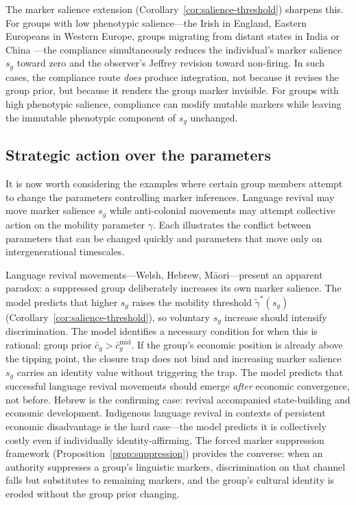 \documentclass[12pt,a4paper]{article}
\theoremstyle{definition}
\numberwithin{proposition}{subsection}
\begin{document}
The marker salience extension
(Corollary~\ref{cor:salience-threshold}) sharpens this. For groups
with low phenotypic salience---the Irish in England, Eastern
Europeans in Western Europe, groups migrating from distant states in India or China ---the compliance simultaneously reduces the
individual's marker salience $s_g$ toward zero and the observer's Jeffrey revision
toward non-firing. In such cases, the compliance route \emph{does}
produce integration, not because it revises the group prior, but
because it renders the group marker invisible. For groups with high
phenotypic salience, compliance
can modify mutable markers while leaving the immutable phenotypic
component of $s_g$ unchanged. 

\subsection{Strategic action over the parameters}
\label{subsec:cluster-parameters}

It is now worth considering the examples where certain group members attempt to change the parameters controlling marker inferences. Language revival may move marker salience $s_g$ while anti-colonial movements may attempt
collective action on the mobility parameter $\gamma$. Each illustrates the conflict between
parameters that can be changed quickly and parameters that move only
on intergenerational timescales.

Language revival movements---Welsh, Hebrew, M\={a}ori---present an
apparent paradox: a suppressed group deliberately increases its own
marker salience. The model predicts that higher $s_g$ raises the
mobility threshold $\tilde{\gamma}^*(s_g)$
(Corollary~\ref{cor:salience-threshold}), so voluntary $s_g$ increase
should intensify discrimination. The model
identifies a necessary condition for when this is rational: group prior $\bar{c}_g >
\bar{c}_g^{\mathrm{mid}}$. If the group's economic position is
already above the tipping point, the closure trap does not bind and
increasing marker salience $s_g$ carries an identity value without triggering the
trap. The model predicts that successful language revival movements
should emerge \emph{after} economic convergence, not before. Hebrew
is the confirming case: revival accompanied state-building and
economic development. Indigenous language revival in contexts of
persistent economic disadvantage is the hard case---the model
predicts it is collectively costly even if individually
identity-affirming. The forced marker suppression framework
(Proposition~\ref{prop:suppression}) provides the converse: when an
authority suppresses a group's linguistic markers, discrimination on
that channel falls but substitutes to remaining markers, and the
group's cultural identity is eroded without the group prior changing.
\end{document}
